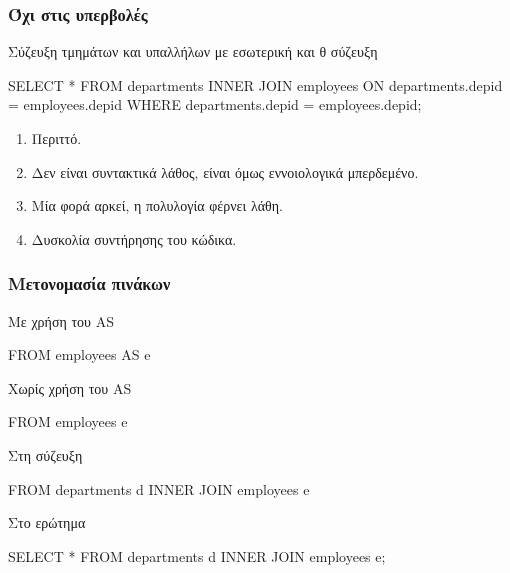 \begin{frame}
\frametitle{Όχι στις υπερβολές}
\begin{minipage}{\wE}
\begin{alertblock}{\small Σύζευξη τμημάτων και υπαλλήλων με εσωτερική και θ σύζευξη}
\en
\begin{SQL}
  SELECT *
    FROM departments INNER JOIN employees
         ON departments.depid = employees.depid
   WHERE departments.depid = employees.depid;
\end{SQL}
\el
\end{alertblock}
\pause
\begin{enumerate} \itemsep 6pt
  \item Περιττό.
  \item Δεν είναι συντακτικά λάθος, είναι όμως εννοιολογικά μπερδεμένο.
  \item Μία φορά αρκεί, η πολυλογία φέρνει λάθη. 
  \item Δυσκολία συντήρησης του κώδικα.
\end{enumerate}
\end{minipage}
\end{frame}



\begin{frame}
\frametitle{Μετονομασία πινάκων}
\begin{minipage}{\wE}
\vspace*{-0.5cm}
\begin{block}{Με χρήση του {\en AS}}
\en
\begin{SQL}
    FROM employees AS e
\end{SQL}
\el
\end{block}
\vspace*{-0.4cm}
\begin{block}{Χωρίς χρήση του {\en AS}}
\en
\begin{SQL}
    FROM employees e
\end{SQL}
\el
\end{block}
\pause
\vspace*{-0.4cm}
\begin{block}{Στη σύζευξη}
\en
\begin{SQL}
    FROM departments d INNER JOIN employees e
\end{SQL}
\el
\end{block}
\pause
\begin{block}{Στο ερώτημα}
\en
\begin{SQL}
  SELECT *
    FROM departments d INNER JOIN employees e;   
\end{SQL}
\el
\end{block}
\end{minipage}
\end{frame}



